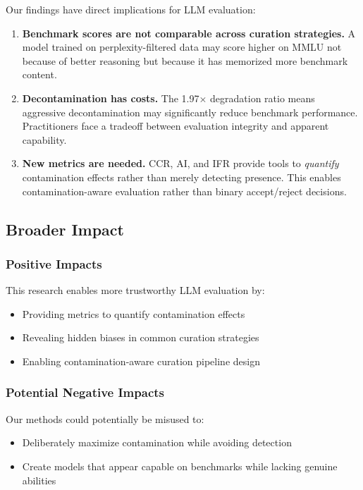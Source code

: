 Our findings have direct implications for LLM evaluation:

\begin{enumerate}
    \item \textbf{Benchmark scores are not comparable across curation strategies.} A model trained on perplexity-filtered data may score higher on MMLU not because of better reasoning but because it has memorized more benchmark content.

    \item \textbf{Decontamination has costs.} The 1.97$\times$ degradation ratio means aggressive decontamination may significantly reduce benchmark performance. Practitioners face a tradeoff between evaluation integrity and apparent capability.

    \item \textbf{New metrics are needed.} CCR, AI, and IFR provide tools to \textit{quantify} contamination effects rather than merely detecting presence. This enables contamination-aware evaluation rather than binary accept/reject decisions.
\end{enumerate}

\subsection{Broader Impact}

\subsubsection{Positive Impacts}

This research enables more trustworthy LLM evaluation by:
\begin{itemize}
    \item Providing metrics to quantify contamination effects
    \item Revealing hidden biases in common curation strategies
    \item Enabling contamination-aware curation pipeline design
\end{itemize}

\subsubsection{Potential Negative Impacts}

Our methods could potentially be misused to:
\begin{itemize}
    \item Deliberately maximize contamination while avoiding detection
    \item Create models that appear capable on benchmarks while lacking genuine abilities
\end{itemize}

